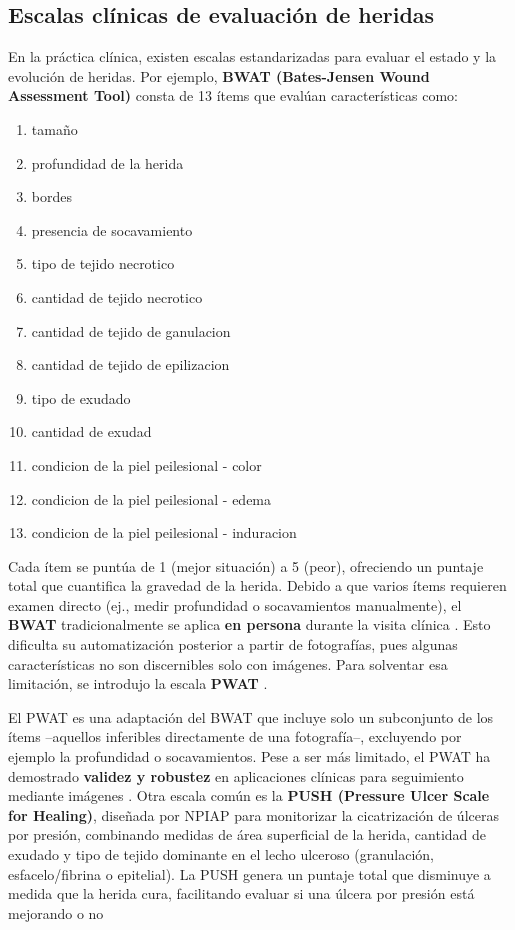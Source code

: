 \subsection{Escalas clínicas de evaluación de heridas}

En la práctica clínica, existen escalas estandarizadas para evaluar el estado y la evolución de heridas. Por ejemplo, \textbf{BWAT (Bates-Jensen Wound Assessment Tool)} consta de 13 ítems que evalúan características como:
\begin{enumerate}
    \item tamaño
    \item profundidad de la herida
    \item bordes
    \item presencia de socavamiento
    \item tipo de tejido necrotico
    \item cantidad de tejido necrotico
    \item cantidad de tejido de ganulacion
    \item cantidad de tejido de epilizacion
    \item tipo de exudado
    \item cantidad de exudad
    \item condicion de la piel peilesional - color
    \item condicion de la piel peilesional - edema
    \item condicion de la piel peilesional - induracion
    
\end{enumerate}
Cada ítem se puntúa de 1 (mejor situación) a 5 (peor), ofreciendo un puntaje total que cuantifica la gravedad de la herida. Debido a que varios ítems requieren examen directo (ej., medir profundidad o socavamientos manualmente), el \textbf{BWAT} tradicionalmente se aplica \textbf{en persona} durante la visita clínica . Esto dificulta su automatización posterior a partir de fotografías, pues algunas características no son discernibles solo con imágenes. Para solventar esa limitación, se introdujo la escala \textbf{PWAT} \cite{Curti2024}. 

El PWAT es una adaptación del BWAT que incluye solo un subconjunto de los ítems –aquellos inferibles directamente de una fotografía–, excluyendo por ejemplo la profundidad o socavamientos. Pese a ser más limitado, el PWAT ha demostrado \textbf{validez y robustez} en aplicaciones clínicas para seguimiento mediante imágenes . Otra escala común es la \textbf{PUSH (Pressure Ulcer Scale for Healing)}, diseñada por NPIAP para monitorizar la cicatrización de úlceras por presión, combinando medidas de área superficial de la herida, cantidad de exudado y tipo de tejido dominante en el lecho ulceroso (granulación, esfacelo/fibrina o epitelial). La PUSH genera un puntaje total que disminuye a medida que la herida cura, facilitando evaluar si una úlcera por presión está mejorando o no

